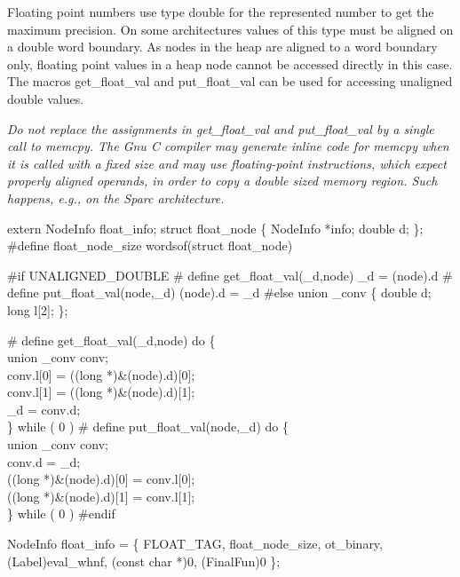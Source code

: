 \nwendcode{}\nwdocspar
Floating point numbers use type {\Tt{}double\nwendquote} for the represented number
to get the maximum precision. On some architectures values of this
type must be aligned on a double word boundary. As nodes in the heap
are aligned to a word boundary only, floating point values in a heap
node cannot be accessed directly in this case. The macros
{\Tt{}get{\_}float{\_}val\nwendquote} and {\Tt{}put{\_}float{\_}val\nwendquote} can be used for accessing
unaligned {\Tt{}double\nwendquote} values.

\emph{Do not replace the assignments in {\Tt{}get{\_}float{\_}val\nwendquote} and
{\Tt{}put{\_}float{\_}val\nwendquote} by a single call to {\Tt{}memcpy\nwendquote}. The Gnu C compiler
may generate inline code for {\Tt{}memcpy\nwendquote} when it is called with a fixed
size and may use floating-point instructions, which expect properly
aligned operands, in order to copy a {\Tt{}double\nwendquote} sized memory
region. Such happens, e.g., on the Sparc architecture.}

\nwenddocs{}\plusendmoddef\nwstartdeflinemarkup{}\nwenddeflinemarkup
extern NodeInfo float_info;
struct float_node \{
    NodeInfo *info;
    double   d;
\};
#define float_node_size         wordsof(struct float_node)

#if UNALIGNED_DOUBLE
# define get_float_val(_d,node) _d = (node).d
# define put_float_val(node,_d) (node).d = _d
#else
union _conv \{
    double d;
    long   l[2];
\};

# define get_float_val(_d,node) do \{ \\
    union _conv conv; \\
    conv.l[0] = ((long *)&(node).d)[0]; \\
    conv.l[1] = ((long *)&(node).d)[1]; \\
    _d = conv.d; \\
\} while ( 0 )
# define put_float_val(node,_d) do \{ \\
    union _conv conv; \\
    conv.d = _d; \\
    ((long *)&(node).d)[0] = conv.l[0]; \\
    ((long *)&(node).d)[1] = conv.l[1]; \\
\} while ( 0 )
#endif

\nwendcode{}\nwdocspar
\nwenddocs{}\endmoddef\nwstartdeflinemarkup{}\nwenddeflinemarkup
NodeInfo float_info = \{
    FLOAT_TAG, float_node_size, ot_binary, (Label)eval_whnf, (const char *)0,
    (FinalFun)0
\};

